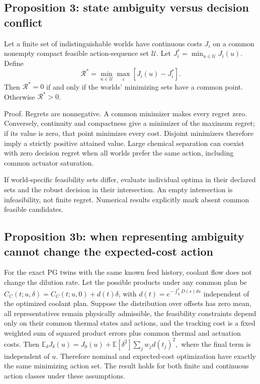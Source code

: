 \documentclass[
  11pt,
]{article}
\begin{document}
\hypertarget{proposition-3-state-ambiguity-versus-decision-conflict}{%
\subsection{Proposition 3: state ambiguity versus decision
conflict}\label{proposition-3-state-ambiguity-versus-decision-conflict}}

Let a finite set of indistinguishable worlds have continuous costs
\(J_i\) on a common nonempty compact feasible action-sequence set
\(\mathcal U\). Let \(J_i^*=\min_{u\in\mathcal U}J_i(u)\). Define
\[\mathcal R^*=\min_{u\in\mathcal U}\max_i[J_i(u)-J_i^*].\] Then
\(\mathcal R^*=0\) if and only if the worlds' minimizing sets have a
common point. Otherwise \(\mathcal R^*>0\).

Proof. Regrets are nonnegative. A common minimizer makes every regret
zero. Conversely, continuity and compactness give a minimizer of the
maximum regret; if its value is zero, that point minimizes every cost.
Disjoint minimizers therefore imply a strictly positive attained value.
Large chemical separation can coexist with zero decision regret when all
worlds prefer the same action, including common actuator saturation.

If world-specific feasibility sets differ, evaluate individual optima in
their declared sets and the robust decision in their intersection. An
empty intersection is infeasibility, not finite regret. Numerical
results explicitly mark absent common feasible candidates.

\hypertarget{proposition-3b-when-representing-ambiguity-cannot-change-the-expected-cost-action}{%
\subsection{Proposition 3b: when representing ambiguity cannot change
the expected-cost
action}\label{proposition-3b-when-representing-ambiguity-cannot-change-the-expected-cost-action}}

For the exact PG twins with the same known feed history, coolant flow
does not change the dilution rate. Let the possible products under any
common plan be \(C_C(t;u,\delta)=C_C(t;u,0)+d(t)\delta\), with
\(d(t)=e^{-\int_0^tD(s)ds}\) independent of the optimized coolant plan.
Suppose the distribution over offsets has zero mean, all representatives
remain physically admissible, the feasibility constraints depend only on
their common thermal states and actions, and the tracking cost is a
fixed weighted sum of squared product errors plus common thermal and
actuation costs. Then
\(\mathbb E_\delta J_\delta(u)=J_0(u)+\mathbb E[\delta^2]\sum_j w_jd(t_j)^2,\)
where the final term is independent of \(u\). Therefore nominal and
expected-cost optimization have exactly the same minimizing action set.
The result holds for both finite and continuous action classes under
these assumptions.
\end{document}

